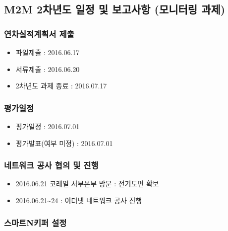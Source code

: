 \documentclass[]{article}
\author{}
\date{}
\begin{document}
\subsection{M2M 2차년도 일정 및 보고사항 (모니터링
과제)}\label{m2m-2uxcc28uxb144uxb3c4-uxc77cuxc815-uxbc0f-uxbcf4uxace0uxc0acuxd56d-uxbaa8uxb2c8uxd130uxb9c1-uxacfcuxc81c}

\subsubsection{연차실적계획서
제출}\label{uxc5f0uxcc28uxc2e4uxc801uxacc4uxd68duxc11c-uxc81cuxcd9c}

\begin{itemize}
\itemsep1pt\parskip0pt
\item
  파일제출 : 2016.06.17
\item
  서류제출 : 2016.06.20
\item
  2차년도 과제 종료 : 2016.07.17
\end{itemize}

\subsubsection{평가일정}\label{uxd3c9uxac00uxc77cuxc815}

\begin{itemize}
\itemsep1pt\parskip0pt
\item
  평가일정 : 2016.07.01
\item
  평가발표(여부 미정) : 2016.07.01
\end{itemize}

\subsubsection{네트워크 공사 협의 및
진행}\label{uxb124uxd2b8uxc6ccuxd06c-uxacf5uxc0ac-uxd611uxc758-uxbc0f-uxc9c4uxd589}

\begin{itemize}
\itemsep1pt\parskip0pt
\item
  2016.06.21 코레일 서부본부 방문 : 전기도면 확보
\item
  2016.06.21\textasciitilde{}24 : 이더넷 네트워크 공사 진행
\end{itemize}

\subsubsection{스마트N키퍼
설정}\label{uxc2a4uxb9c8uxd2b8nuxd0a4uxd37c-uxc124uxc815}
\end{document}
